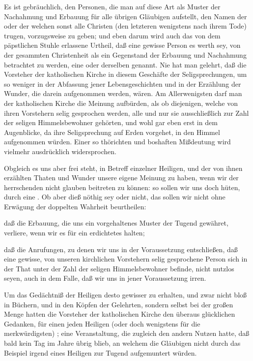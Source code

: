 \begin{aufza}
\item Es ist gebräuchlich, den Personen, die man auf diese Art als Muster der Nachahmung und Erbauung für alle übrigen Gläubigen aufstellt, den Namen der  oder der  welchen sonst alle Christen (den letzteren wenigstens nach ihrem Tode) trugen, vorzugsweise zu geben; und eben darum wird auch das von dem päpstlichen Stuhle erlassene Urtheil, daß eine gewisse Person es werth sey, von der gesammten Christenheit als ein Gegenstand der Erbauung und Nachahmung betrachtet zu werden, eine  oder  derselben genannt. Nie hat man gelehrt, daß die Vorsteher der katholischen Kirche in diesem Geschäfte der Seligsprechungen, um so weniger in der Abfassung jener Lebensgeschichten und in der Erzählung der Wunder, die darein aufgenommen werden,  wären. Am Allerwenigsten darf man der katholischen Kirche die Meinung aufbürden, als ob diejenigen, welche von ihren Vorstehern selig gesprochen werden, alle und nur sie ausschließlich zur Zahl der seligen Himmelsbewohner gehörten, und wohl gar eben erst in dem Augenblicke, da ihre Seligsprechung auf Erden vorgehet, in den Himmel aufgenommen würden. Einer so thörichten und boshaften Mißdeutung wird vielmehr ausdrücklich widersprochen.
\item Obgleich es uns aber frei steht, in Betreff einzelner Heiligen, und der von ihnen erzählten Thaten und Wunder unsere eigene Meinung zu haben, wenn wir der herrschenden nicht glauben beitreten zu können: so sollen wir uns doch hüten, durch eine . Ob aber dieß nöthig sey oder nicht, das sollen wir nicht ohne Erwägung der doppelten Wahrheit beurtheilen:
\begin{aufzb}
\item daß die Erbauung, die uns ein vorgehaltenes Muster der Tugend gewähret, verliere, wenn wir es für ein erdichtetes halten;
\item daß die Anrufungen, zu denen wir uns in der Voraussetzung entschließen, daß eine gewisse, von unseren kirchlichen Vorstehern selig gesprochene Person sich in der That unter der Zahl der seligen Himmelsbewohner befinde, nicht nutzlos seyen, auch in dem Falle, daß wir uns in jener Voraussetzung irren.
\end{aufzb}
\item Um das Gedächtniß der Heiligen desto gewisser zu erhalten, und zwar nicht bloß in Büchern, und in den Köpfen der Gelehrten, sondern selbst bei der großen Menge hatten die Vorsteher der katholischen Kirche den überaus glücklichen Gedanken, für einen jeden Heiligen (oder doch wenigstens für die merkwürdigsten) ; eine Veranstaltung, die zugleich den andern Nutzen hatte, daß bald kein Tag im Jahre übrig blieb, an welchem die Gläubigen nicht durch das Beispiel irgend eines Heiligen zur Tugend aufgemuntert würden.

\end{aufza}
